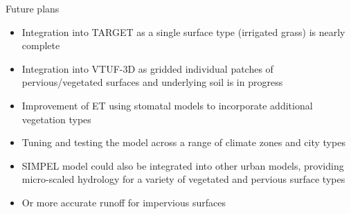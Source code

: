 \documentclass{beamer}
\begin{document}
\begin{frame}{Future plans} 

\begin{itemize}

\item Integration into TARGET as a single surface type (irrigated grass) is nearly complete

\item Integration into VTUF-3D as gridded individual patches of pervious/vegetated surfaces and underlying soil is in progress

\item Improvement of ET using stomatal models to incorporate additional vegetation types

\item Tuning and testing the model across a range of climate zones and city types

\item SIMPEL model could also be integrated into other urban models, providing micro-scaled hydrology for a variety of vegetated and pervious surface types

\item Or more accurate runoff for impervious surfaces


\end{itemize}


\end{frame}



%
%
\end{document}
